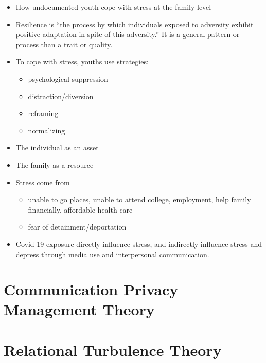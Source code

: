 \documentclass[
]{book}
\providecommand{\tightlist}{%
  \setlength{\itemsep}{0pt}\setlength{\parskip}{0pt}}
\begin{document}
\begin{itemize}
\item
  How undocumented youth cope with stress at the family level
\item
  Resilience is ``the process by which individuals exposed to adversity exhibit
  positive adaptation in spite of this adversity.'' It is a general pattern or process than a trait or quality.
\item
  To cope with stress, youths use strategies:

  \begin{itemize}
  \item
    psychological suppression
  \item
    distraction/diversion
  \item
    reframing
  \item
    normalizing
  \end{itemize}
\item
  The individual as an asset
\item
  The family as a resource
\item
  Stress come from

  \begin{itemize}
  \item
    unable to go places, unable to attend college, employment, help family financially, affordable health care
  \item
    fear of detainment/deportation
  \end{itemize}
\end{itemize}

\citep{First_2020}

\begin{itemize}
\tightlist
\item
  Covid-19 exposure directly influence stress, and indirectly influence stress and depress through media use and interpersonal communication.
\end{itemize}

\hypertarget{communication-privacy-management-theory}{%
\section{Communication Privacy Management Theory}\label{communication-privacy-management-theory}}

\hypertarget{relational-turbulence-theory}{%
\section{Relational Turbulence Theory}\label{relational-turbulence-theory}}
\end{document}
